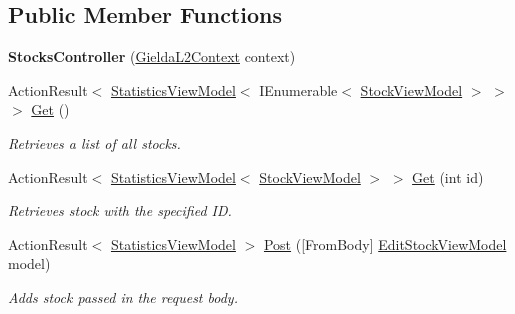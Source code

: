 \subsection*{Public Member Functions}
\begin{DoxyCompactItemize}
\item 
\mbox{\label{class_gielda_l2_1_1_a_p_i_1_1_controllers_1_1_stocks_controller_ade3beae2417a52f2545b54b492e06ed8}} 
{\bfseries Stocks\+Controller} (\mbox{\hyperlink{class_gielda_l2_1_1_d_b_1_1_gielda_l2_context}{Gielda\+L2\+Context}} context)
\item 
Action\+Result$<$ \mbox{\hyperlink{class_gielda_l2_1_1_a_p_i_1_1_view_models_1_1_view_1_1_statistics_view_model}{Statistics\+View\+Model}}$<$ I\+Enumerable$<$ \mbox{\hyperlink{class_gielda_l2_1_1_a_p_i_1_1_view_models_1_1_view_1_1_stock_view_model}{Stock\+View\+Model}} $>$ $>$ $>$ \mbox{\hyperlink{class_gielda_l2_1_1_a_p_i_1_1_controllers_1_1_stocks_controller_a3265a9c160c9a1f7f493423739f90561}{Get}} ()
\begin{DoxyCompactList}\small\item\em Retrieves a list of all stocks. \end{DoxyCompactList}\item 
Action\+Result$<$ \mbox{\hyperlink{class_gielda_l2_1_1_a_p_i_1_1_view_models_1_1_view_1_1_statistics_view_model}{Statistics\+View\+Model}}$<$ \mbox{\hyperlink{class_gielda_l2_1_1_a_p_i_1_1_view_models_1_1_view_1_1_stock_view_model}{Stock\+View\+Model}} $>$ $>$ \mbox{\hyperlink{class_gielda_l2_1_1_a_p_i_1_1_controllers_1_1_stocks_controller_acbb679302b68f67ebfc9c22184332f27}{Get}} (int id)
\begin{DoxyCompactList}\small\item\em Retrieves stock with the specified ID. \end{DoxyCompactList}\item 
Action\+Result$<$ \mbox{\hyperlink{class_gielda_l2_1_1_a_p_i_1_1_view_models_1_1_view_1_1_statistics_view_model}{Statistics\+View\+Model}} $>$ \mbox{\hyperlink{class_gielda_l2_1_1_a_p_i_1_1_controllers_1_1_stocks_controller_af9f6e39e439883c0c2af93a3081213ec}{Post}} (\mbox{[}From\+Body\mbox{]} \mbox{\hyperlink{class_gielda_l2_1_1_a_p_i_1_1_view_models_1_1_edit_1_1_edit_stock_view_model}{Edit\+Stock\+View\+Model}} model)
\begin{DoxyCompactList}\small\item\em Adds stock passed in the request body. \end{DoxyCompactList}\item 

\end{DoxyCompactItemize}
